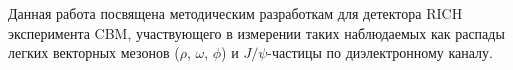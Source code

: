 
Данная работа посвящена методическим разработкам для детектора RICH эксперимента CBM, участвующего в измерении таких наблюдаемых как распады легких векторных мезонов ($\rho$, $\omega$, $\phi$) и $J/\psi$-частицы по диэлектронному каналу.









